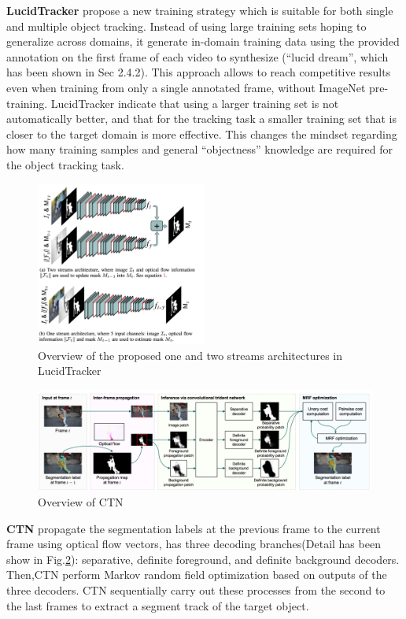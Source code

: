 \textbf{LucidTracker}\cite{LucidTracker} propose a new training strategy which is suitable for both single and multiple object tracking. Instead of using large training sets hoping to generalize across domains, it generate in-domain training data using the provided annotation on the first frame of each video to synthesize (``lucid dream'', which has been shown in Sec 2.4.2). This approach allows to reach competitive results even when training from only a single annotated frame, without ImageNet pre-training. LucidTracker indicate that using a larger training set is not automatically better, and that for the tracking task a smaller training set that is closer to the target domain is more effective. This changes the mindset regarding how many training samples and general ``objectness'' knowledge are required for the object tracking task.

\begin{figure}[ht]
    \centering
    \includegraphics[width=0.5\textwidth]{./figure/lucid_tracker.png}
    \caption{Overview of the proposed one and two streams architectures in LucidTracker}
    \label{lucid_tracker}
\end{figure}

\begin{figure}[ht]
    \centering
    \includegraphics[width=\textwidth]{./figure/CTN.png}
    \caption{Overview of CTN}
    \label{CTN}
\end{figure}

\textbf{CTN}\cite{CTN} propagate the segmentation labels at the previous frame to the current frame using optical ﬂow vectors, has three decoding branches(Detail has been show in Fig.\ref{CTN}): separative, definite foreground, and definite background decoders. Then,CTN perform Markov random field optimization based on outputs of the three decoders. CTN sequentially carry out these processes from the second to the last frames to extract a segment track of the target object. 

